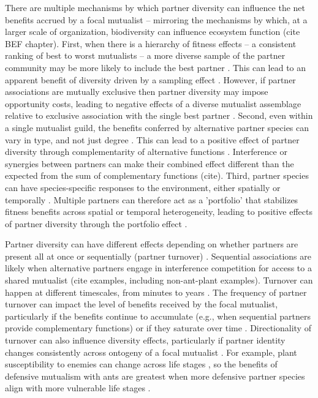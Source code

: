 \documentclass[11pt]{article}
\begin{document}
There are multiple mechanisms by which partner diversity can influence the net benefits accrued by a focal mutualist -- mirroring the mechanisms by which, at a larger scale of organization, biodiversity can influence ecosystem function (cite BEF chapter). 
First, when there is a hierarchy of fitness effects -- a consistent ranking of best to worst mutualists -- a more diverse sample of the partner community may be more likely to include the best partner \cite{Frederickson2013}.
This can lead to an apparent benefit of diversity driven by a sampling effect \cite{Batstone2018}. 
However, if partner associations are mutually exclusive then partner diversity may impose opportunity costs, leading to negative effects of a diverse mutualist assemblage relative to exclusive association with the single best partner \citep{Miller2007}. 
Second, even within a single mutualist guild, the benefits conferred by alternative partner species can vary in type, and not just degree \cite{Stachowicz2005,Bronstein2006,Stanton2003}. 
This can lead to a positive effect of partner diversity through complementarity of alternative functions \cite{Batstone2018}. 
Interference or synergies between partners can make their combined effect different than the expected from the sum of complementary functions (cite). 
Third, partner species can have species-specific responses to the environment, either spatially \citep{Ollerton2006} or temporally \citep{Alarcon2008}. 
Multiple partners can therefore act as a 'portfolio' that stabilizes fitness benefits across spatial or temporal heterogeneity, leading to positive effects of partner diversity through the portfolio effect \cite{Batstone2018,Lazaro2022}. 

Partner diversity can have different effects depending on whether partners are present all at once or sequentially (partner turnover) \citep{Djieto-Lordon2005, Ness2006, Bruna2014}. 
Sequential associations are likely when alternative partners engage in interference competition for access to a shared mutualist (cite examples, including non-ant-plant examples). 
Turnover can happen at different timescales, from minutes to years \citep{Oliveira1999,Horvitz1986}. 
The frequency of partner turnover can impact the level of benefits received by the focal mutualist, particularly if the benefits continue to accumulate (e.g., when sequential partners provide complementary functions) or if they saturate over time \citep{Sachs2004}.
Directionality of turnover can also influence diversity effects, particularly if partner identity changes consistently across ontogeny of a focal mutualist \citep{Fonseca2003}.
For example, plant susceptibility to enemies can change across life stages \citep{Boege2005,Barton2010}, so the benefits of defensive mutualism with ants are greatest when more defensive partner species align with more vulnerable life stages \citep{Djieto-Lordon2005}.
\end{document}
